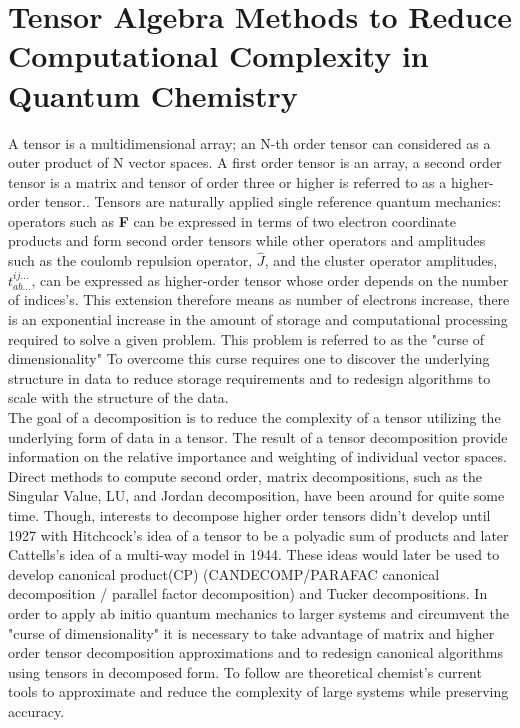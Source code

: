 \section{Tensor Algebra Methods to Reduce Computational Complexity in Quantum Chemistry}
	A tensor is a multidimensional array; an N-th order tensor can considered as a outer product of N vector spaces. A first order tensor is an array, a second order tensor is a matrix and tensor of order three or higher is referred to as a higher-order tensor.\cite{Kolda2008}. Tensors are naturally applied single reference quantum mechanics: operators such as \textbf{F} can be expressed in terms of two electron coordinate products and form second order tensors while other operators and amplitudes such as the coulomb repulsion operator, $\hat{J}$, and the cluster operator amplitudes, $t^{ij\dots}_{ab\dots}$, can be expressed as higher-order tensor whose order depends on the number of indices's.  This extension therefore means as number of electrons increase, there is an exponential increase in the amount of storage and computational processing required to solve a given problem.  This problem is referred to as the "curse of dimensionality" %
	 To overcome this curse requires one to discover the underlying structure in data to reduce storage requirements and to redesign algorithms to scale with the structure of the data.\\
	The goal of a decomposition is to reduce the complexity of a tensor utilizing the underlying form of data in a tensor.  The result of a tensor decomposition provide information on the relative importance and weighting of individual vector spaces.  Direct methods to compute second order, matrix decompositions, such as the Singular Value, LU, and Jordan decomposition, have been around for quite some time.  Though, interests to decompose higher order tensors didn't develop until 1927 with Hitchcock's idea of a tensor to be a polyadic sum of products\cite{Hitchcock 1927, Hitchcock 1928} and later Cattells's idea of a multi-way model in 1944\cite{Cattell 1944, Cattell 1952}. These ideas would later be used to develop canonical product(CP) (CANDECOMP/PARAFAC canonical decomposition / parallel factor decomposition) \cite{Carroll 1970, Harshman 1970} and Tucker decompositions\cite{Tucker 1966}.  In order to apply ab initio quantum mechanics to larger systems and circumvent the "curse of dimensionality" it is necessary to take advantage of matrix and higher order tensor decomposition approximations and to redesign canonical algorithms using tensors in decomposed form. To follow are theoretical chemist's current tools to approximate and reduce the complexity of large systems while preserving accuracy.
